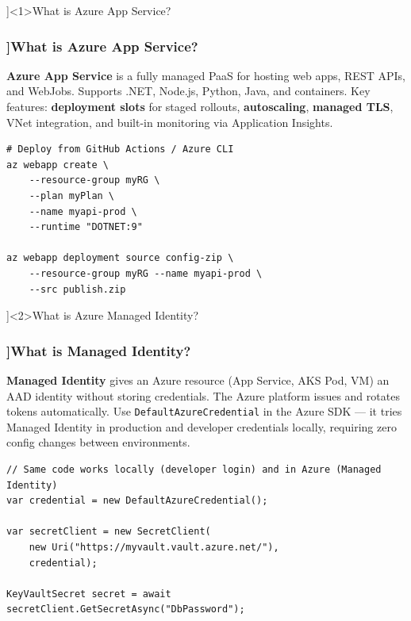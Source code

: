 
\QuestionSlide[\CategoryBadge[AzureColor!20]{Azure}]<1>{What is Azure App Service?}

\begin{frame}[fragile]
  \frametitle{\AnswerTitle[\CategoryBadge[AzureColor!20]{Azure}]{What is Azure App Service?}}

  {\footnotesize
  \textbf{Azure App Service} is a fully managed PaaS for hosting web apps, REST APIs, and WebJobs. Supports .NET, Node.js, Python, Java, and containers. Key features: \textbf{deployment slots} for staged rollouts, \textbf{autoscaling}, \textbf{managed TLS}, VNet integration, and built-in monitoring via Application Insights.
  }

  \begin{verbatim}
# Deploy from GitHub Actions / Azure CLI
az webapp create \
    --resource-group myRG \
    --plan myPlan \
    --name myapi-prod \
    --runtime "DOTNET:9"

az webapp deployment source config-zip \
    --resource-group myRG --name myapi-prod \
    --src publish.zip
  \end{verbatim}
\end{frame}

\QuestionSlide[\CategoryBadge[AzureColor!20]{Azure}]<2>{What is Azure Managed Identity?}

\begin{frame}[fragile]
  \frametitle{\AnswerTitle[\CategoryBadge[AzureColor!20]{Azure}]{What is Managed Identity?}}

  {\footnotesize
  \textbf{Managed Identity} gives an Azure resource (App Service, AKS Pod, VM) an AAD identity without storing credentials. The Azure platform issues and rotates tokens automatically. Use \texttt{DefaultAzureCredential} in the Azure SDK — it tries Managed Identity in production and developer credentials locally, requiring zero config changes between environments.
  }

  \begin{verbatim}
// Same code works locally (developer login) and in Azure (Managed Identity)
var credential = new DefaultAzureCredential();

var secretClient = new SecretClient(
    new Uri("https://myvault.vault.azure.net/"),
    credential);

KeyVaultSecret secret = await secretClient.GetSecretAsync("DbPassword");
  \end{verbatim}
\end{frame}

